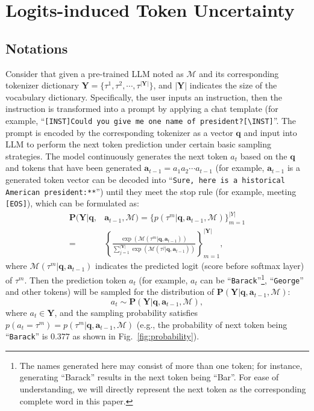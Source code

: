 \section{Logits-induced Token Uncertainty}

\subsection{Notations}
Consider that given a pre-trained LLM noted as $\mathcal{M}$ and its corresponding tokenizer dictionary $\bm{Y}=\{\tau^1,\tau^2,\cdots,\tau^{|\bm{Y}|}\}$, and $|\bm{Y}|$ indicates the size of the vocabulary dictionary. Specifically, the user inputs an instruction, then the instruction is transformed into a prompt by applying a chat template (for example, ``\texttt{[INST]Could you give me one name of president?[\textbackslash INST]}''. The prompt is encoded by the corresponding tokenizer as a vector $\bm{q}$ and input into LLM to perform the next token prediction under certain basic sampling strategies. The model continuously generates the next token $a_{t}$ based on the $\bm{q}$ and tokens that have been generated $\bm{a}_{t-1}=a_{1}a_{2}\cdots a_{t-1}$ (for example, $\bm{a}_{t-1}$ is a generated token vector can be decoded into ``\texttt{Sure, here is a historical American president:**}'') until they meet the stop rule (for example, meeting \texttt{[EOS]}), which can be formulated as:
\begin{equation}
\begin{aligned}
    \textbf{P}(\bm{Y}|\bm{q},&\bm{a}_{t-1},\mathcal{M}) = \{ p(\tau^{m}|\bm{q},\bm{a}_{t-1},\mathcal{M})\}_{m=1}^{|Y|}\\=&\left\{\frac{\exp(\mathcal{M}(\tau^{m}|\bm{q},\bm{a}_{t-1}))}{\sum_{j=1}^{|\bm{Y}|}\exp(\mathcal{M}(\tau^{j}|\bm{q},\bm{a}_{t-1}))}\right\}_{m=1}^{|\bm{Y}|},      
\end{aligned}
\end{equation}
where $\mathcal{M}(\tau^{m}|\bm{q},\bm{a}_{t-1})$ indicates the predicted logit (score before softmax layer) of $\tau^{m}$. Then the prediction token $a_{t}$ (for example, $a_{t}$ can be ``\texttt{Barack}''\footnote{The names generated here may consist of more than one token; for instance, generating ``Barack'' results in the next token being ``Bar''. For ease of understanding, we will directly represent the next token as the corresponding complete word in this paper.}, ``\texttt{George}'' and other tokens) will be sampled for the distribution of $\textbf{P}(\bm{Y}|\bm{q},\bm{a}_{t-1},\mathcal{M})$:
\begin{equation}
    a_t \sim \textbf{P}(\bm{Y}|\bm{q},\bm{a}_{t-1},\mathcal{M}),
\end{equation}
where $a_t \in \bm{Y}$, and the sampling probability satisfies $p(a_t=\tau^{m})={p}(\tau^{m}|\bm{q},\bm{a}_{t-1},\mathcal{M})$ (e.g., the probability of next token being ``\texttt{Barack}'' is $0.377$ as shown in Fig.~\ref{fig:probability}).

